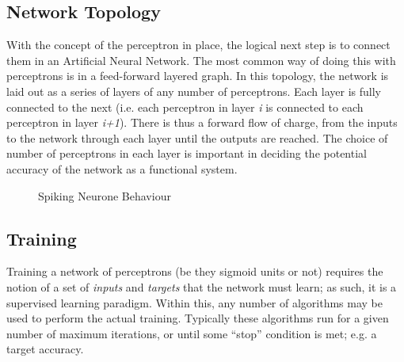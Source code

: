\documentclass{acm_proc_article-sp}
\begin{document}
\subsection{Network Topology}
{
With the concept of the perceptron in place, the logical next step is to
connect them in an Artificial Neural Network. The most common way of
doing this with perceptrons is in a feed{}-forward layered graph. In
this topology, the network is laid out as a series of layers of any
number of perceptrons. Each layer is fully connected to the next (i.e.
each perceptron in layer \textit{i}\textup{ is connected to each
perceptron in layer }\textit{i+1}\textup{). There is thus a forward
flow of charge, from the inputs to the network through each layer until
the outputs are reached. The choice of number of perceptrons in each
layer is important in deciding the potential accuracy of the network as
a functional system.}
}
\begin{figure}[t]
\centering
{}
\caption{Spiking Neurone Behaviour}
\label{fig:anns:spiking}
\end{figure}

\subsection{Training}
{
Training a network of perceptrons (be they sigmoid units or not)
requires the notion of a set of \textit{inputs}\textup{ and
}\textit{targets}\textup{ that the network must learn; as such, it is a
supervised learning paradigm. Within this, any number of algorithms may
be used to perform the actual training. Typically these algorithms run
for a given number of maximum iterations, or until some ``stop''
condition is met; e.g. a target accuracy.}
}
\end{document}
